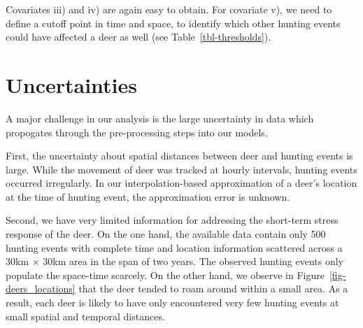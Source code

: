 \documentclass[
  letterpaper,
  DIV=11,
  numbers=noendperiod,
  twocolumn,
  open=any]{scrreprt}
\begin{document}
Covariates iii) and iv) are again easy to obtain. For covariate v), we
need to define a cutoff point in time and space, to identify which other
hunting events could have affected a deer as well (see
Table~\ref{tbl-thresholds}).

\begin{table}

\caption{\label{tbl-thresholds}The three proposed DataSets. For each
DataSet, \emph{Temporal} refers to the upper limit of Time Difference
between Hunting Event an Defecation Event, with the lower limit beeing
zero. \emph{Spatial} refers to the upper limit of the distance between
deer and Hunting event, with the lower beeing zero as well.}


\end{table}%

\section{Uncertainties}\label{uncertainties}

A major challenge in our analysis is the large uncertainty in data which
propogates through the pre-processing steps into our models.

First, the uncertainty about spatial distances between deer and hunting
events is large. While the movement of deer was tracked at hourly
intervals, hunting events occurred irregularly. In our
interpolation-based approximation of a deer's location at the time of
hunting event, the approximation error is unknown.

Second, we have very limited information for addressing the short-term
stress response of the deer. On the one hand, the available data contain
only 500 hunting events with complete time and location information
scattered across a 30km \(\times\) 30km area in the span of two years.
The observed hunting events only populate the space-time scarcely. On
the other hand, we observe in Figure~\ref{fig-deers_locations} that the
deer tended to roam around within a small area. As a result, each deer
is likely to have only encountered very few hunting events at small
spatial and temporal distances.
\end{document}
